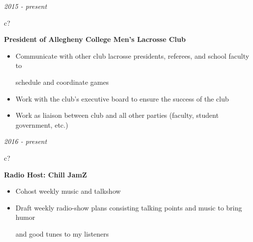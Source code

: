 \documentclass[12pt,a4paper,sans]{moderncv} %
\begin{document}
\textit{2015 - present}
\hspace{-1.7 mm}
\begin{tabular}{c?}
 \\
\end{tabular}
 \hspace{2 mm}
 \textbf{President of Allegheny College Men's Lacrosse Club} 
 \vspace{0 mm}
 \begin{itemize}
 \addtolength{\itemindent}{31.7 mm}
 \item{Communicate with other club lacrosse presidents, referees, and school faculty to 
 
 \hspace{32 mm}schedule and coordinate games}
 
 
 \item{Work with the club's executive board to ensure the success of the club }
 \item{Work as liaison between club and all other parties (faculty, student government, etc.)}
 \end{itemize}
 
  
\textit{2016 - present}
\hspace{-1.7 mm}
\begin{tabular}{c?}
 \\
\end{tabular}
 \hspace{2 mm}
 \textbf{Radio Host: Chill JamZ} 
 \vspace{0 mm}
 \begin{itemize}
 \addtolength{\itemindent}{31.7 mm}
 \item{Cohost weekly music and talkshow}
 \item{Draft weekly radio-show plans consisting talking points and music to bring humor 
 
 \hspace{32 mm}and good tunes to my listeners}
 \end{itemize}
 


\end{document}

